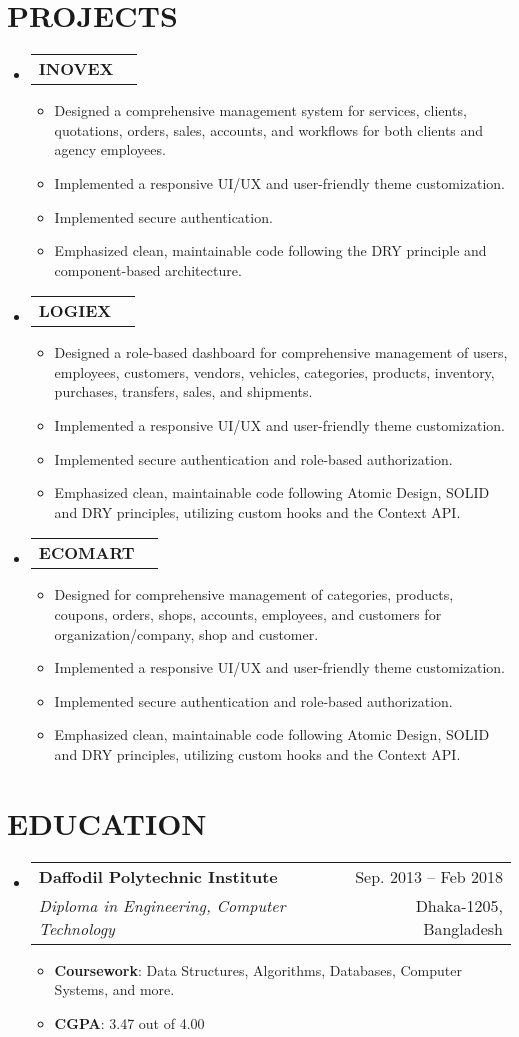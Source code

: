 \documentclass[letterpaper,11pt]{article}
\makeatletter
\newcommand{\resumeItem}[1]{
  \item\small{
    {#1 \vspace{-1pt}}
  }
}
\newcommand{\resumeSubheading}[4]{
  \vspace{-1pt}\item
    \begin{tabular*}{\textwidth}[t]{l@{\extracolsep{\fill}}r}
      \textbf{#1} & {\color{dark-grey}\small #2}\vspace{1pt}\\ %
      \textit{#3} & {\color{dark-grey} \small #4}\\ %
    \end{tabular*}\vspace{-4pt}
}
\newcommand{\resumeProjectHeading}[2]{
    \item
    \begin{tabular*}{\textwidth}{l@{\extracolsep{\fill}}r}
      #1 & {\color{dark-grey}} \\
    \end{tabular*}\vspace{-4pt}
}
\newcommand{\resumeSubHeadingListStart}{\begin{itemize}[leftmargin=0in, label={}]}
\newcommand{\resumeSubHeadingListEnd}{\end{itemize}}
\newcommand{\resumeItemListStart}{\begin{itemize}}
\newcommand{\resumeItemListEnd}{\end{itemize}\vspace{0pt}}
\makeatother
\begin{document}
\section{PROJECTS}
    \resumeSubHeadingListStart
      \resumeProjectHeading
        {\textbf{INOVEX}} {}
          \resumeItemListStart
            \resumeItem{Designed a comprehensive management system for services, clients, quotations, orders, sales, accounts, and workflows for both clients and agency employees.}
            \resumeItem{Implemented a responsive UI/UX and user-friendly theme customization.}
            \resumeItem{Implemented secure authentication.}
            \resumeItem{Emphasized clean, maintainable code following the DRY principle and component-based architecture.}
          \resumeItemListEnd
      \resumeProjectHeading
        {\textbf{LOGIEX}} {}
          \resumeItemListStart
            \resumeItem{Designed a role-based dashboard for comprehensive management of users, employees, customers, vendors, vehicles, categories, products, inventory, purchases, transfers, sales, and shipments.}
            \resumeItem{Implemented a responsive UI/UX and user-friendly theme customization.}
            \resumeItem{Implemented secure authentication and role-based authorization.}
            \resumeItem{Emphasized clean, maintainable code following Atomic Design, SOLID and DRY principles, utilizing custom hooks and the Context API.}
          \resumeItemListEnd
      \resumeProjectHeading
        {\textbf{ECOMART}} {}
          \resumeItemListStart
            \resumeItem{Designed for comprehensive management of categories, products, coupons, orders, shops, accounts, employees, and customers for organization/company, shop and customer.}
            \resumeItem{Implemented a responsive UI/UX and user-friendly theme customization.}
            \resumeItem{Implemented secure authentication and role-based authorization.}
            \resumeItem{Emphasized clean, maintainable code following Atomic Design, SOLID and DRY principles, utilizing custom hooks and the Context API.}
          \resumeItemListEnd
    \resumeSubHeadingListEnd

\section {EDUCATION}
  \resumeSubHeadingListStart
    \resumeSubheading
      {Daffodil Polytechnic Institute}{Sep. 2013 -- Feb 2018}
      {Diploma in Engineering, Computer Technology}{Dhaka-1205, Bangladesh}
      	\resumeItemListStart
    	    \resumeItem {\textbf{Coursework}:  Data Structures, Algorithms, Databases, Computer Systems, and more.}
          \resumeItem {\textbf{CGPA}: 3.47 out of 4.00}
        \resumeItemListEnd
  \resumeSubHeadingListEnd
\end{document}
